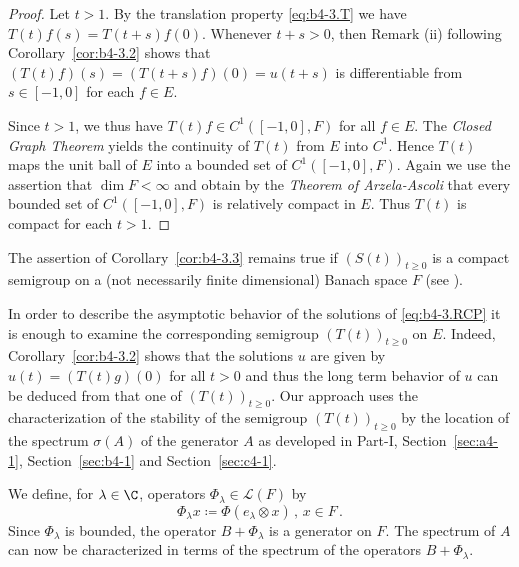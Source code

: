 \begin{proof} 
Let $t > 1$. 
By the translation property \eqref{eq:b4-3.T} we have $T(t)f(s) = T(t+s)f(0)$. Whenever $t + s > 0$, then Remark (ii) following Corollary~\ref{cor:b4-3.2} shows that $(T(t)f)(s) = (T(t+s)f)(0) = u(t+s)$ is differentiable from $s \in [-1,0]$ for each $f \in E$.

Since $t > 1$, we thus have $T(t)f \in C^1([-1,0],F)$ for all $f \in E$. 
The \emph{Closed Graph Theorem} yields the continuity of\/ $T(t)$ from $E$ into $C^1$. 
Hence $T(t)$ maps the unit ball of\/ $E$ into a bounded set of\/ $C^1([-1,0],F)$. 
Again we use the assertion that $\dim F < \infty$ and obtain by the \emph{Theorem of Arzela-Ascoli} that every bounded set of\/ $C^1([-1,0],F)$ is relatively compact in $E$. 
Thus $T(t)$ is compact for each $t > 1$.
\end{proof}
The assertion of Corollary~\ref{cor:b4-3.3} remains true if\/ $(S(t))_{t \geq 0}$ is a compact semigroup on a (not necessarily finite dimensional) Banach space $F$ (see \textcite{traviswebb:1974}).

In order to describe the asymptotic behavior of the solutions of \eqref{eq:b4-3.RCP} it is enough to examine the corresponding semigroup $(T(t))_{t \geq 0}$ on $E$. 
Indeed, Corollary~\ref{cor:b4-3.2} shows that the solutions $u$ are given by $u(t) = (T(t)g)(0)$ for all $t > 0$ and thus the long term behavior of\/ $u$ can be deduced from that one of\/ $(T(t))_{t \geq 0}$. 
Our approach uses the characterization of the stability of the semigroup $(T(t))_{t \geq 0}$ by the location of the spectrum $\sigma(A)$ of the generator $A$ as developed in Part-I, Section~\ref{sec:a4-1},  Section~\ref{sec:b4-1} and Section~\ref{sec:c4-1}.

We define, for $\lambda \in \C$, operators $\Phi_\lambda \in \mathcal{L}(F)$ by
\begin{equation}\label{eq:b4-3.3}
	\Phi_\lambda x  \coloneq  \Phi(e_\lambda \otimes x) \, , \, x \in F \, .
\end{equation}
Since $\Phi_\lambda$ is bounded, the operator $B + \Phi_\lambda$ is a generator on $F$. 
The spectrum of\/ $A$ can now be characterized in terms of the spectrum of the operators $B + \Phi_\lambda$.

